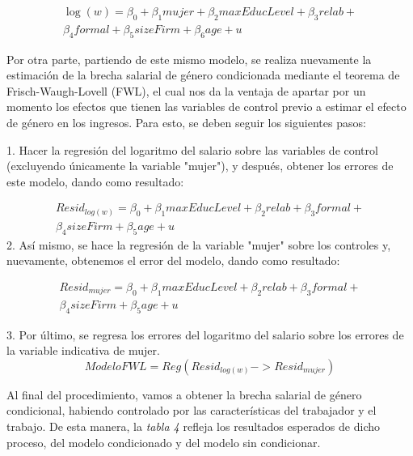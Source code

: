 \documentclass[10pt]{article}
\begin{document}
\begin{multline}
\log(w) = \beta_0 + \beta_1 mujer + \beta_2 maxEducLevel + \beta_3 relab + \\
\beta_4 formal + \beta_5 sizeFirm + \beta_6 age + u
\end{multline}


Por otra parte, partiendo de este mismo modelo, se realiza nuevamente la estimación de la brecha salarial de género condicionada mediante el teorema de Frisch-Waugh-Lovell (FWL), el cual nos da la ventaja de apartar por un momento los efectos que tienen las variables de control previo a estimar el efecto de género en los ingresos. Para esto, se deben seguir los siguientes pasos: 

1. Hacer la regresión del logaritmo del salario sobre las variables de control (excluyendo únicamente la variable "mujer"), y después, obtener los errores de este modelo, dando como resultado: 

\begin{multline}
 Resid_{log(w)}= \beta_0 + \beta_1 maxEducLevel + \beta_2 relab + \beta_3 formal + \\
 \beta_4 sizeFirm + \beta_5 age + u 
\end{multline}
2. Así mismo, se hace la regresión de la variable "mujer" sobre los controles y, nuevamente, obtenemos el error del modelo, dando como resultado:

\begin{multline}
 Resid_{mujer}= \beta_0 + \beta_1 maxEducLevel + \beta_2 relab + 
\beta_3 formal + \\
\beta_4 sizeFirm + \beta_5 age + u 
\end{multline}

3. Por último, se regresa los errores del logaritmo del salario sobre los errores de la variable indicativa de mujer. 
\begin{equation}
\label{eq:ols}
    ModeloFWL = Reg (Resid_{log(w)} -> Resid_{mujer})
\end{equation}

Al final del procedimiento, vamos a obtener la brecha salarial de género condicional, habiendo controlado por las características del trabajador y el trabajo. 
De esta manera, la \textit{tabla 4} refleja los resultados esperados de dicho proceso, del modelo condicionado y del modelo sin condicionar.
\end{document}
